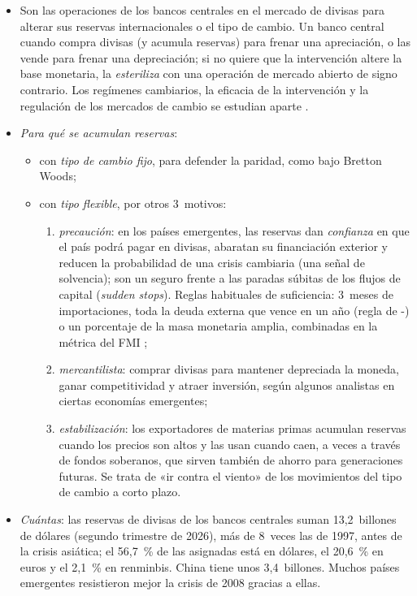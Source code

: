 \documentclass[11pt]{article}
\begin{document}
\begin{itemize}
\item Son las operaciones de los bancos centrales en el mercado de divisas para alterar sus reservas internacionales o el tipo de cambio. Un banco central  cuando compra divisas (y acumula reservas) para frenar una apreciación, o las vende para frenar una depreciación; si no quiere que la intervención altere la base monetaria, la \emph{esteriliza} con una operación de mercado abierto de signo contrario. Los regímenes cambiarios, la eficacia de la intervención y la regulación de los mercados de cambio se estudian aparte .
\item \emph{Para qué se acumulan reservas}:
  \begin{itemize}
  \item con \emph{tipo de cambio fijo}, para defender la paridad, como bajo Bretton Woods;
  \item con \emph{tipo flexible}, por otros 3~motivos:
    \begin{enumerate}
    \item \emph{precaución}: en los países emergentes, las reservas dan \emph{confianza} en que el país podrá pagar en divisas, abaratan su financiación exterior y reducen la probabilidad de una crisis cambiaria (una señal de solvencia); son un seguro frente a las paradas súbitas de los flujos de capital (\emph{sudden stops}). Reglas habituales de suficiencia: 3~meses de importaciones, toda la deuda externa que vence en un año (regla de -) o un porcentaje de la masa monetaria amplia, combinadas en la métrica del FMI\nocite{Greenspan1999Currency,FMI2011Reserve} ;
    \item \emph{mercantilista}: comprar divisas para mantener depreciada la moneda, ganar competitividad y atraer inversión, según algunos analistas en ciertas economías emergentes;
    \item \emph{estabilización}: los exportadores de materias primas acumulan reservas cuando los precios son altos y las usan cuando caen, a veces a través de fondos soberanos, que sirven también de ahorro para generaciones futuras. Se trata de «ir contra el viento» de los movimientos del tipo de cambio a corto plazo.
    \end{enumerate}
  \end{itemize}
\item \emph{Cuántas}: las reservas de divisas de los bancos centrales suman 13,2~billones de dólares (segundo trimestre de 2026), más de 8~veces las de 1997, antes de la crisis asiática; el 56,7~\% de las asignadas está en dólares, el 20,6~\% en euros y el 2,1~\% en renminbis\nocite{FMI2026COFERNota}. China tiene unos 3,4~billones\nocite{SAFE2026Reservas}. Muchos países emergentes resistieron mejor la crisis de 2008 gracias a ellas.

\end{itemize}
\end{document}

